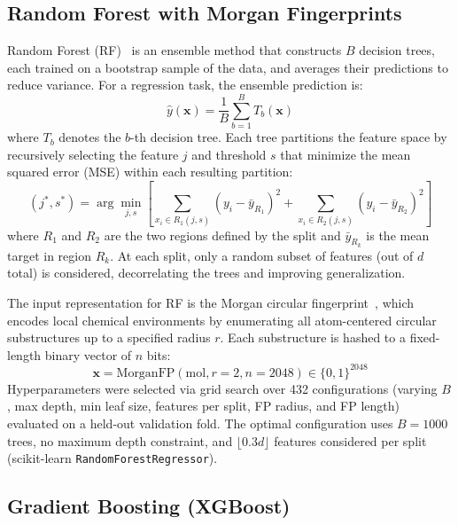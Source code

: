 \documentclass[11pt,a4paper]{article}
\newcommand{\vect}[1]{\mathbf{#1}}
\begin{document}
\FloatBarrier
\subsection{Random Forest with Morgan Fingerprints}
\label{sec:rf}

Random Forest (RF)~\cite{breiman2001random} is an ensemble method that constructs $B$ decision trees, each trained on a bootstrap sample of the data, and averages their predictions to reduce variance.
For a regression task, the ensemble prediction is:
\begin{equation}
    \hat{y}(\vect{x}) = \frac{1}{B} \sum_{b=1}^{B} T_b(\vect{x})
\end{equation}
where $T_b$ denotes the $b$-th decision tree.
Each tree partitions the feature space by recursively selecting the feature $j$ and threshold $s$ that minimize the mean squared error (MSE) within each resulting partition:
\begin{equation}
    (j^*, s^*) = \arg\min_{j, s} \left[ \sum_{x_i \in R_1(j,s)} (y_i - \bar{y}_{R_1})^2 + \sum_{x_i \in R_2(j,s)} (y_i - \bar{y}_{R_2})^2 \right]
\end{equation}
where $R_1$ and $R_2$ are the two regions defined by the split and $\bar{y}_{R_k}$ is the mean target in region $R_k$.
At each split, only a random subset of features (out of $d$ total) is considered, decorrelating the trees and improving generalization.

The input representation for RF is the Morgan circular fingerprint~\cite{rogers2010extended}, which encodes local chemical environments by enumerating all atom-centered circular substructures up to a specified radius $r$.
Each substructure is hashed to a fixed-length binary vector of $n$ bits:
\begin{equation}
    \vect{x} = \text{MorganFP}(\text{mol}, r=2, n=2048) \in \{0, 1\}^{2048}
\end{equation}
Hyperparameters were selected via grid search over 432 configurations (varying $B$, max depth, min leaf size, features per split, FP radius, and FP length) evaluated on a held-out validation fold.
The optimal configuration uses $B = 1000$ trees, no maximum depth constraint, and $\lfloor 0.3d \rfloor$ features considered per split (scikit-learn \texttt{RandomForestRegressor}).


\subsection{Gradient Boosting (XGBoost)}
\label{sec:xgboost}
\end{document}
